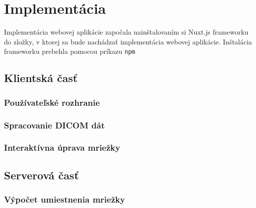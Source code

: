 \chapter {Implementácia}

Implementácia webovej aplikácie započala nainštalovaním si Nuxt.js frameworku do zložky, v ktorej sa bude nachádzať implementácia webovej aplikácie. Inštalácia frameworku prebehla pomocou príkazu \texttt{npm }

\section {Klientská časť}

\subsection {Používateľské rozhranie}

\subsection {Spracovanie DICOM dát}

\subsection {Interaktívna úprava mriežky}

\section {Serverová časť}

\subsection {Výpočet umiestnenia mriežky}